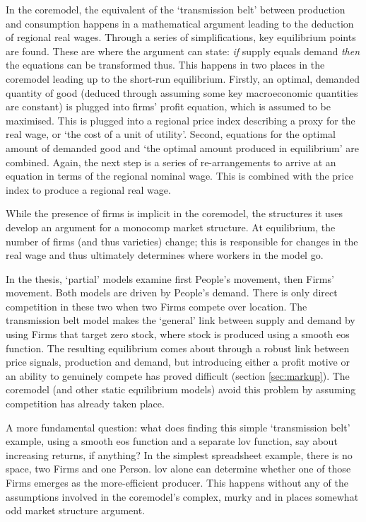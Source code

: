 In the \gls{coremodel}, the equivalent of the `transmission belt' between production and consumption happens in a mathematical argument leading to the deduction of regional real wages. Through a series of simplifications, key equilibrium points are found. These are where the argument can state: \emph{if} supply equals demand \emph{then} the equations can be transformed thus. This happens in two places in the \gls{coremodel} leading up to the short-run equilibrium. Firstly, an optimal, demanded quantity of good (deduced through assuming some key macroeconomic quantities are constant) is plugged into firms' profit equation, which is assumed to be maximised. This is plugged into a regional price index describing a proxy for the real wage, or `the cost of a unit of utility'. Second, equations for the optimal amount of demanded good and `the optimal amount produced in equilibrium' are combined. Again, the next step is a series of re-arrangements to arrive at an equation in terms of the regional nominal wage. This is combined with the price index to produce a regional real wage.

While the presence of firms is implicit in the \gls{coremodel}, the structures it uses develop an argument for a \gls{monocomp} market structure. At equilibrium, the number of firms (and thus varieties) change; this is responsible for changes in the real wage and thus ultimately determines where workers in the model go. 

In the thesis, `partial' models examine first People's movement, then Firms' movement. Both models are driven by People's demand. There is only direct competition in these two when two Firms compete over location. The transmission belt model makes the `general' link between supply and demand by using Firms that target zero stock, where stock is produced using a smooth \gls{eos} function. The resulting equilibrium comes about through a robust link between price signals, production and demand, but introducing either a profit motive or an ability to genuinely compete has proved difficult (section \ref{sec:markup}). The \gls{coremodel} (and other static equilibrium models) avoid this problem by assuming competition has already taken place. 

A more fundamental question: what does finding this simple `transmission belt' example, using a smooth \gls{eos} function and a separate \gls{lov} function, say about increasing returns, if anything? In the simplest spreadsheet example, there is no space, two Firms and one Person. \Gls{lov} alone can determine whether one of those Firms emerges as the more-efficient producer. This happens without any of the assumptions involved in the \gls{coremodel}'s complex, murky and in places somewhat odd market structure argument. 

